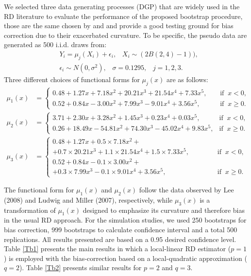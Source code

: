 \documentclass[12pt,fleqn]{article}
\begin{document}
We selected three data generating processes (DGP) that are widely used in the RD
literature to evaluate the performance of the proposed bootstrap procedure, 
those are the same chosen by \cite{calonico2014} and \cite{IK} and provide a 
good testing ground for bias correction due to their exacerbated curvature. 
To be specific, the pseudo data are generated as 500 i.i.d. draws from:
\begin{align*}
& Y_{i} = \mu_{j}(X_{i}) + \epsilon_{i}, \;\;\; X_{i} \sim  (2 B (2,4) - 1)), \\
& \epsilon_{i} \sim N(0, \sigma^{2}), \;\;\; \sigma = 0.1295, \;\;\; j = 1,2,3.
\end{align*}
Three different choices of functional forms for $\mu_{j}(x)$ are as follows:
\begin{align}
\mu_{1}(x) & = 
\begin{cases}
0.48 + 1.27x + 7.18x^{2} + 20.21x^{3} + 21.54x^{4} + 7.33x^{5}, \;\;\;\; & \text{if} \;\; x < 0, \\
0.52 + 0.84x - 3.00x^{2} + 7.99x^3 - 9.01x^4 + 3.56x^{5},  & \text{if} \;\; x \ge 0.
\end{cases}
\\
\mu_{2}(x) & = 
\begin{cases}
3.71 + 2.30x + 3.28x^2 + 1.45x^3 + 0.23x^4 + 0.03x^5, \;\; & \text{if} \;\; x < 0, \\
0.26 + 18.49x - 54.81x^2 + 74.30x^3 - 45.02x^4 + 9.83x^5,  & \text{if} \;\; x \ge 0.
\end{cases}
\\
\mu_{3}(x) & =
\begin{cases}
0.48 + 1.27x + 0.5 \times 7.18x^{2}+ \\
+ 0.7 \times 20.21x^3 + 1.1 \times 21.54x^4 + 1.5 \times 7.33x^5, \;\;\;\;\;\;\;\;\;\;\;\; & \text{if} \;\; x < 0, \\
0.52 + 0.84x - 0.1 \times 3.00x^{2}+ \\
+ 0.3 \times 7.99x^3 - 0.1 \times 9.01x^4 + 3.56x^5, & \text{if} \;\; x \ge 0.
\end{cases}
\end{align}

The functional form for $\mu_{1}(x)$ and $\mu_{2}(x)$ follow the data observed 
by Lee (2008) and Ludwig and Miller (2007), respectively, while $\mu_{3}(x)$ is
a transformation of $\mu_{1}(x)$ designed to emphasize its curvature and 
therefore bias in the usual RD approach. For the simulation studies, we used 
250 bootstraps for bias correction, 999 bootstraps to calculate confidence 
interval and a total 500 replications. All results presented are based on a 
0.95 desired confidence level. Table \ref{Tb1} presents the main results in which
a local-linear RD estimator ($p=1$) is employed with the bias-correction based 
on a local-quadratic approximation ($q=2$). Table \ref{Tb2} presents similar 
results for $p=2$ and $q=3$.
\end{document}
